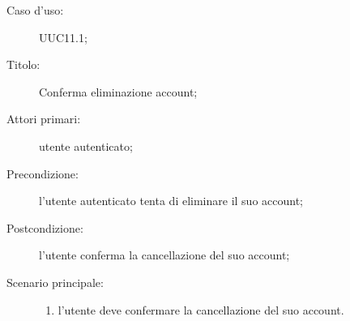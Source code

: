 \documentclass[../../../analisi-dei-requisiti.tex]{subfiles}
\begin{document}
\begin{description}
  \item[Caso d’uso:] UUC11.1;
  \item[Titolo:] Conferma eliminazione account;
  \item[Attori primari:] utente autenticato;
  \item[Precondizione:] l'utente autenticato tenta di eliminare il suo account;
  \item[Postcondizione:] l'utente conferma la cancellazione del suo account;
  \item[Scenario principale:]
        \begin{enumerate}
          \item l'utente deve confermare la cancellazione del suo account.
        \end{enumerate}
\end{description}
\end{document}
